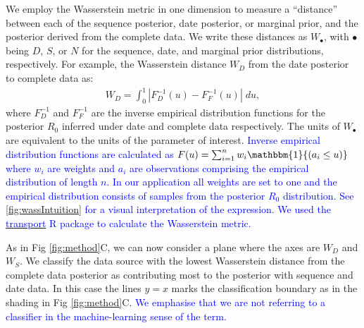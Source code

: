 \documentclass{article}
\begin{document}
We  employ the Wasserstein metric in one dimension to measure a ``distance'' between each of the sequence posterior, date posterior, or marginal prior, and the posterior derived from the complete data. We write these distances as $W_{\bullet}$, with $\bullet$ being $D$, $S$, or $N$ for the sequence, date, and marginal prior distributions, respectively. For example, the Wasserstein distance $W_D$ from the date posterior to complete data as:
\begin{align*}
W_D = \int_0^1 |F_{D}^{-1}(u)-F_{F}^{-1}(u)| \; du, 
\end{align*}
where $F_{D}^{-1}$ and $F_{F}^{-1}$ are the inverse empirical distribution functions for the posterior $R_{0}$ inferred under date and complete data respectively. The units of $W_{\bullet}$ are equivalent to the units of the parameter of interest. \textcolor{blue}{Inverse empirical distribution functions are calculated as $F(u) = \sum_{i=1}^{n} w_{i}\mathbbm{1}{(a_{i}\leq u)}$ where $w_{i}$ are weights and $a_{i}$ are observations comprising the empirical distribution of length $n$. In our application all weights are set to one and the empirical distribution consists of samples from the posterior $R_{0}$ distribution. See \ref{fig:wassIntuition} for a visual interpretation of the expression. We used the \href{https://www.rdocumentation.org/packages/transport/versions/0.12-2/topics/wasserstein1d}{\textcolor{blue}{transport}} R package to calculate the Wasserstein metric.} 

As in Fig \ref{fig:method}C, we can now consider a plane where the axes are $W_{D}$ and $W_{S}$. We classify the data source with the lowest Wasserstein distance from the complete data posterior as contributing most to the posterior with sequence and date data. In this case the lines $y=x$ marks the classification boundary as in the shading in Fig \ref{fig:method}C. \textcolor{blue}{We emphasise that we are not referring to a classifier in the machine-learning sense of the term.}
\end{document}
